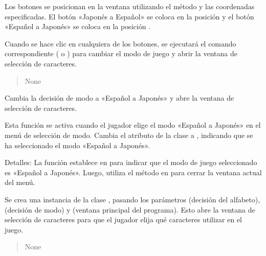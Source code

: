 \documentclass[letterpaper,10pt,spanish]{sphinxmanual}
\begin{document}
\begin{fulllineitems}
\begin{fulllineitems}
\sphinxAtStartPar
Los botones se posicionan en la ventana utilizando el método  y las coordenadas  especificadas.
El botón «Japonés a Español» se coloca en la posición  y el botón «Español a Japonés» se coloca en la
posición .

\sphinxAtStartPar
Cuando se hace clic en cualquiera de los botones, se ejecutará el comando correspondiente (
 o ) para cambiar el modo de juego y abrir la ventana de
selección de caracteres.
\begin{quote}\begin{description}
\sphinxAtStartPar
None

\end{description}\end{quote}

\end{fulllineitems}


\begin{fulllineitems}
\label{\detokenize{menu_juego:menu_juego.MenuJuego.espanol_a_japones}}
\pysigstartsignatures
{}
\pysigstopsignatures
\sphinxAtStartPar
Cambia la decisión de modo a «Español a Japonés» y abre la ventana de selección de caracteres.

\sphinxAtStartPar
Esta función se activa cuando el jugador elige el modo «Español a Japonés» en el menú de selección de modo.
Cambia el atributo  de la clase a , indicando que se ha seleccionado el modo «Español a
Japonés».

\sphinxAtStartPar
Detalles:
La función establece  en  para indicar que el modo de juego seleccionado es
«Español a Japonés». Luego, utiliza el método  en  para cerrar la ventana actual del
menú.

\sphinxAtStartPar
Se crea una instancia de la clase , pasando los parámetros  (decisión del
alfabeto),  (decisión de modo) y  (ventana principal del programa). Esto
abre la ventana de selección de caracteres para que el jugador elija qué caracteres utilizar en el juego.
\begin{quote}\begin{description}
\sphinxAtStartPar
None


\end{description}
\end{quote}
\end{fulllineitems}
\end{fulllineitems}
\end{document}
